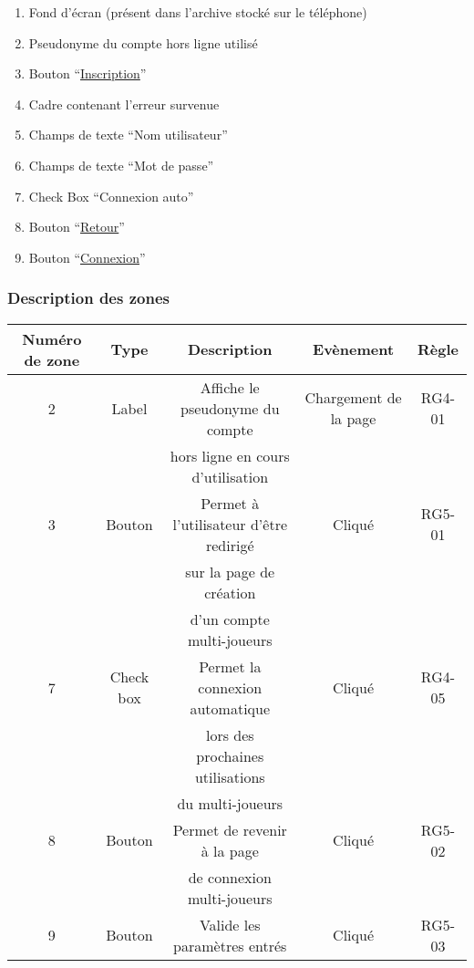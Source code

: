 \documentclass{report}
\begin{document}
		\hypertarget{Connexion multi-joueurs}{}
		\label{Connexion multi-joueurs}
	
		\begin{center}
					
		\end{center}
		
		\begin{enumerate}
		  \item Fond d'écran (présent dans l'archive stocké sur le téléphone)
		  \item Pseudonyme du compte hors ligne utilisé
		  \item Bouton ``\hyperlink{Creation compte multi-joueurs}{Inscription}''
		  \item Cadre contenant l'erreur survenue
		  \item Champs de texte ``Nom utilisateur''
		  \item Champs de texte ``Mot de passe''
		  \item Check Box ``Connexion auto''
		  \item Bouton ``\hyperlink{Accueil}{Retour}''
		  \item Bouton ``\hyperlink{Accueil multi-joueurs}{Connexion}''
		\end{enumerate}

		\subsubsection{Description des zones}
		
			\begin{tabular}{|c|c|c|c|c|} \hline
				Numéro de zone & Type  & Description & Evènement &	Règle \\\hline
				2 & Label & Affiche le pseudonyme du compte & Chargement de la page & RG4-01 \\
				  &       & hors ligne en cours d'utilisation & & \\\hline
				3 & Bouton & Permet à l'utilisateur d'être redirigé & Cliqué & RG5-01\\
				  &        & sur la page de création  & & \\
				  &        & d'un compte multi-joueurs \footnotemark[1] & & \\\hline
				7 & Check box & Permet la connexion automatique & Cliqué & RG4-05 \\
				  &           & lors des prochaines utilisations&        & \\				
				  &           & du multi-joueurs                &        & \\\hline
				8 & Bouton & Permet de revenir à la page & Cliqué & RG5-02 \\
				  &        & de connexion multi-joueurs \footnotemark[2] & & \\\hline
				9 & Bouton & Valide les paramètres entrés & Cliqué & RG5-03 \\\hline
			\end{tabular}
			
\end{document}
